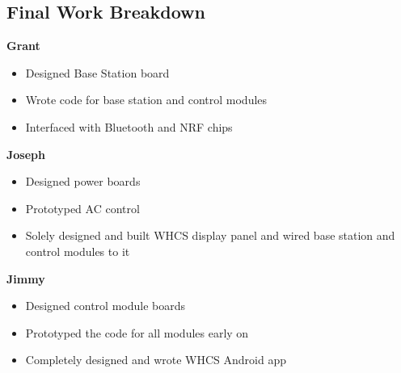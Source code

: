 \subsection{Final Work Breakdown}

{\bfseries \large Grant}
\begin{itemize}
  \item Designed Base Station board
  \item Wrote code for base station and control modules
  \item Interfaced with Bluetooth and NRF chips
\end{itemize}

{\bfseries \large Joseph}
\begin{itemize}
  \item Designed power boards
\item Prototyped AC control
\item Solely designed and built WHCS display panel and wired base station and control modules to it
\end{itemize}

{\bfseries \large Jimmy}
\begin{itemize}
  \item Designed control module boards
  \item Prototyped the code for all modules early on
  \item Completely designed and wrote WHCS Android app
\end{itemize}
